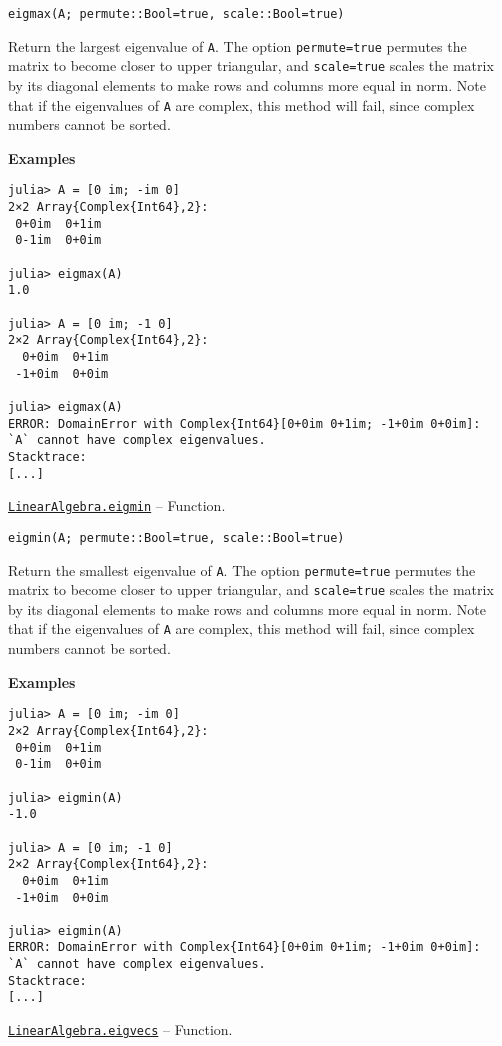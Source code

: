 \begin{adjustwidth}{2em}{0pt}


\begin{verbatim}
eigmax(A; permute::Bool=true, scale::Bool=true)
\end{verbatim}

Return the largest eigenvalue of \texttt{A}. The option \texttt{permute=true} permutes the matrix to become closer to upper triangular, and \texttt{scale=true} scales the matrix by its diagonal elements to make rows and columns more equal in norm. Note that if the eigenvalues of \texttt{A} are complex, this method will fail, since complex numbers cannot be sorted.

\textbf{Examples}


\begin{verbatim}
julia> A = [0 im; -im 0]
2×2 Array{Complex{Int64},2}:
 0+0im  0+1im
 0-1im  0+0im

julia> eigmax(A)
1.0

julia> A = [0 im; -1 0]
2×2 Array{Complex{Int64},2}:
  0+0im  0+1im
 -1+0im  0+0im

julia> eigmax(A)
ERROR: DomainError with Complex{Int64}[0+0im 0+1im; -1+0im 0+0im]:
`A` cannot have complex eigenvalues.
Stacktrace:
[...]
\end{verbatim}



\end{adjustwidth}
\hypertarget{658135215942727363}{} 
\hyperlink{658135215942727363}{\texttt{LinearAlgebra.eigmin}}  -- {Function.}

\begin{adjustwidth}{2em}{0pt}


\begin{verbatim}
eigmin(A; permute::Bool=true, scale::Bool=true)
\end{verbatim}

Return the smallest eigenvalue of \texttt{A}. The option \texttt{permute=true} permutes the matrix to become closer to upper triangular, and \texttt{scale=true} scales the matrix by its diagonal elements to make rows and columns more equal in norm. Note that if the eigenvalues of \texttt{A} are complex, this method will fail, since complex numbers cannot be sorted.

\textbf{Examples}


\begin{verbatim}
julia> A = [0 im; -im 0]
2×2 Array{Complex{Int64},2}:
 0+0im  0+1im
 0-1im  0+0im

julia> eigmin(A)
-1.0

julia> A = [0 im; -1 0]
2×2 Array{Complex{Int64},2}:
  0+0im  0+1im
 -1+0im  0+0im

julia> eigmin(A)
ERROR: DomainError with Complex{Int64}[0+0im 0+1im; -1+0im 0+0im]:
`A` cannot have complex eigenvalues.
Stacktrace:
[...]
\end{verbatim}



\end{adjustwidth}
\hypertarget{8591842276375230542}{} 
\hyperlink{8591842276375230542}{\texttt{LinearAlgebra.eigvecs}}  -- {Function.}


